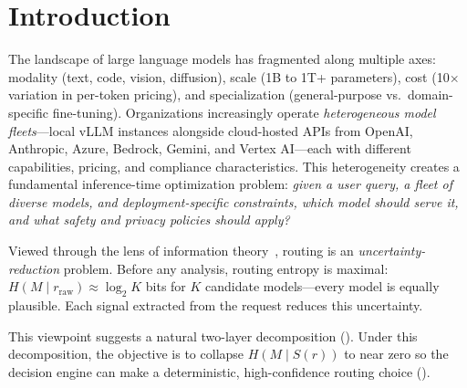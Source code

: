 
\section{Introduction}
\label{sec:introduction}

The landscape of large language models has fragmented along multiple axes: modality (text, code, vision, diffusion), scale (1B to 1T+ parameters), cost (10$\times$ variation in per-token pricing), and specialization (general-purpose vs.\ domain-specific fine-tuning).
Organizations increasingly operate \emph{heterogeneous model fleets}---local vLLM instances alongside cloud-hosted APIs from OpenAI, Anthropic, Azure, Bedrock, Gemini, and Vertex AI---each with different capabilities, pricing, and compliance characteristics.
This heterogeneity creates a fundamental inference-time optimization problem: \emph{given a user query, a fleet of diverse models, and deployment-specific constraints, which model should serve it, and what safety and privacy policies should apply?}

Viewed through the lens of information theory~\cite{shannon1948mathematical}, routing is an \emph{uncertainty-reduction} problem.
Before any analysis, routing entropy is maximal: $H(M \mid r_\text{raw}) \approx \log_2 K$ bits for $K$ candidate models---every model is equally plausible.
Each signal extracted from the request reduces this uncertainty.

This viewpoint suggests a natural two-layer decomposition ().
Under this decomposition, the objective is to collapse $H(M \mid S(r))$ to near zero so the decision engine can make a deterministic, high-confidence routing choice ().

